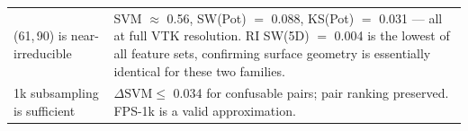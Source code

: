 \begin{center}
\begin{tabular}{lp{9.2cm}}
    (61,\,90) is near-irreducible & SVM $\approx$ 0.56, SW(Pot) $=$ 0.088,
                            KS(Pot) $=$ 0.031 --- all at full VTK resolution.
                            RI SW(5D) $=$ 0.004 is the lowest of all feature
                            sets, confirming surface geometry is essentially
                            identical for these two families. \\[3pt]
    1k subsampling is sufficient & $\Delta\text{SVM} \leq$ 0.034 for confusable
                            pairs; pair ranking preserved.
                            FPS-1k is a valid approximation. \\
    \bottomrule
  \end{tabular}
\end{center}
